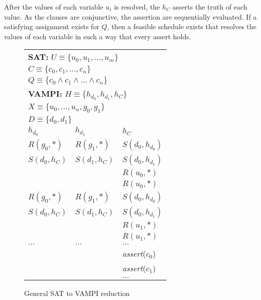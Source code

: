 After the values of each variable $u_i$ is resolved, the $h_C$ asserts
the truth of each value. As the clauses are conjunctive, the assertion
are sequentially evaluated. If a satisfying assignment exists for $Q$,
then a feasible schedule exists that resolves the values of each
variable in such a way that every assert holds.

\begin{figure}
\begin{center}
\setlength{\tabcolsep}{2pt}
\begin{tabular}[t]{|l|l|l|}
\hline
\multicolumn{3}{|l|}{\textbf{SAT:} $\mathit{U\equiv\{u_0,u_1,...,u_m\}}$}\\
              \multicolumn{3}{|l|}{$\mathit{C\equiv\{c_0,c_1,...,c_n\}}$}\\
              \multicolumn{3}{|l|}{$\mathit{Q\equiv\{c_0\wedge c_1\wedge ...\wedge c_n\}}$}\\
\hline
\multicolumn{3}{|l|}{\textbf{VAMPI:} $\mathit{H\equiv\{h_{d_0},h_{d_1},h_{C}\}}$}\\
                \multicolumn{3}{|l|}{$\mathit{X\equiv\{u_0,...,u_n,g_0,g_1\}}$}\\
                \multicolumn{3}{|l|}{$\mathit{D\equiv\{d_0,d_1\}}$}\\
\hline
$h_{d_0}$ & $h_{d_1}$ & $h_C$ \\
\hline
$R(g_{0},*)$   & $R(g_{1},*)$   & $S(d_0,h_{d_0})$ \\
$S(d_{0},h_C)$ & $S(d_{1},h_C)$ & $S(d_0,h_{d_1})$ \\
              &                & $R(u_0,*)$        \\
              &                & $R(u_0,*)$        \\
\hline
$R(g_{0},*)$  &  $R(g_{1},*)$   & $S(d_0,h_{d_0})$ \\
$S(d_{0},h_C)$&  $S(d_{1},h_C)$ & $S(d_0,h_{d_1})$ \\
              &                & $R(u_1,*)$       \\
              &                & $R(u_1,*)$       \\
\hline
$\ldots$      &  $\ldots$      & $\ldots$                \\
\hline
              &                & \textit{assert}($c_0$) \\
              &                & \textit{assert}($c_1$) \\
              &                & $\ldots$ \\
\hline
\end{tabular}
\end{center}
\caption{General SAT to VAMPI reduction}
\label{fig:vampi}
\end{figure}

